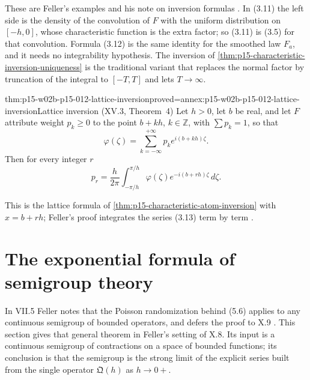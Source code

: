 These are Feller's examples and his note on inversion formulas
\cite[vol.~II, XV.3, pp.~510--511]{Feller1971ProbabilityII}. In (3.11) the
left side is the density of the convolution of \(F\) with the uniform
distribution on \([-h,0]\), whose characteristic function is the extra factor;
so (3.11) is (3.5) for that convolution. Formula (3.12) is the same identity
for the smoothed law \(F_a\), and it needs no integrability hypothesis. The
inversion of \cref{thm:p15-characteristic-inversion-uniqueness} is the
traditional variant that replaces the normal factor by truncation of the
integral to \([-T,T]\) and lets \(T\to\infty\).

\begin{hbtheorem}{thm:p15-w02b-p15-012-lattice-inversion}{proved=annex:p15-w02b-p15-012-lattice-inversion}{Lattice inversion (XV.3, Theorem~4)}
Let \(h>0\), let \(b\) be real, and let \(F\) attribute weight \(p_k\geq0\) to
the point \(b+kh\), \(k\in\mathbb Z\), with \(\sum p_k=1\), so that
\[
 \varphi(\zeta)=\sum_{k=-\infty}^{+\infty}p_ke^{i(b+kh)\zeta}.
 \tag{3.13}
\]
Then for every integer \(r\)
\[
 p_r=\frac h{2\pi}\int_{-\pi/h}^{\pi/h}\varphi(\zeta)e^{-i(b+rh)\zeta}\,d\zeta .
 \tag{3.14}
\]
\end{hbtheorem}

This is the lattice formula of \cref{thm:p15-characteristic-atom-inversion}
with \(x=b+rh\); Feller's proof integrates the series (3.13) term by term
\cite[vol.~II, XV.3, p.~511]{Feller1971ProbabilityII}.

\section{The exponential formula of semigroup theory}
\label{sec:p15-w02b-p15-012-semigroups}

In VII.5 Feller notes that the Poisson randomization behind (5.6) applies to
any continuous semigroup of bounded operators, and defers the proof to X.9
\cite[vol.~II, VII.5, p.~232]{Feller1971ProbabilityII}. This section gives
that general theorem in Feller's setting of X.8. Its input is a continuous
semigroup of contractions on a space of bounded functions; its conclusion is
that the semigroup is the strong limit of the explicit series built from the
single operator \(\mathfrak Q(h)\) as \(h\to0+\).

